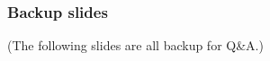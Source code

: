 \documentclass[handout,xcolor={dvipsnames}]{beamer}
\begin{document}
%
%



\begin{frame}
\frametitle{Backup slides}
\begin{center}
\large
(The following slides are all backup for Q\&A.)
\end{center}
\end{frame}
\end{document}
